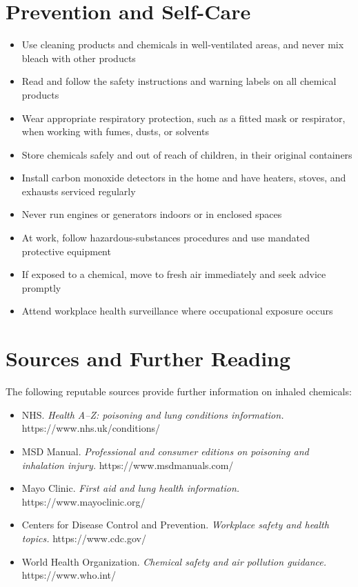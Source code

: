 \section*{Prevention and Self-Care}
\begin{itemize}
    \item Use cleaning products and chemicals in well-ventilated areas, and never mix bleach with other products
    \item Read and follow the safety instructions and warning labels on all chemical products
    \item Wear appropriate respiratory protection, such as a fitted mask or respirator, when working with fumes, dusts, or solvents
    \item Store chemicals safely and out of reach of children, in their original containers
    \item Install carbon monoxide detectors in the home and have heaters, stoves, and exhausts serviced regularly
    \item Never run engines or generators indoors or in enclosed spaces
    \item At work, follow hazardous-substances procedures and use mandated protective equipment
    \item If exposed to a chemical, move to fresh air immediately and seek advice promptly
    \item Attend workplace health surveillance where occupational exposure occurs
\end{itemize}

\section*{Sources and Further Reading}
The following reputable sources provide further information on inhaled chemicals:
\begin{itemize}
    \item NHS. \textit{Health A--Z: poisoning and lung conditions information.} https://www.nhs.uk/conditions/
    \item MSD Manual. \textit{Professional and consumer editions on poisoning and inhalation injury.} https://www.msdmanuals.com/
    \item Mayo Clinic. \textit{First aid and lung health information.} https://www.mayoclinic.org/
    \item Centers for Disease Control and Prevention. \textit{Workplace safety and health topics.} https://www.cdc.gov/
    \item World Health Organization. \textit{Chemical safety and air pollution guidance.} https://www.who.int/
\end{itemize}
